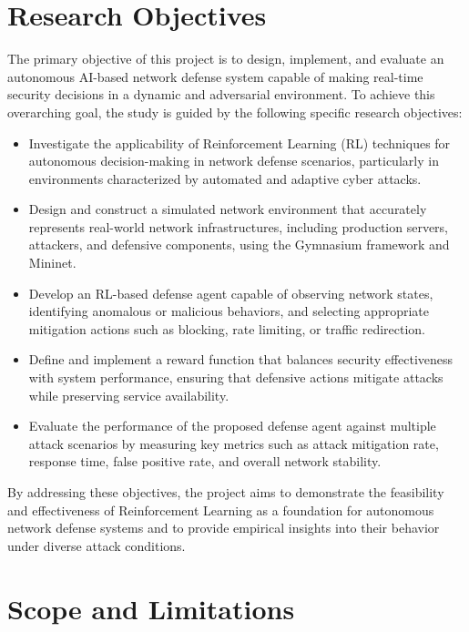 \documentclass[12pt,a4paper]{report}
\begin{document}
\section{Research Objectives}

The primary objective of this project is to design, implement, and evaluate an autonomous AI-based network defense system capable of making real-time security decisions in a dynamic and adversarial environment.
To achieve this overarching goal, the study is guided by the following specific research objectives:

\begin{itemize}
    \item Investigate the applicability of Reinforcement Learning (RL) techniques for autonomous decision-making in network defense scenarios, particularly in environments characterized by automated and adaptive cyber attacks.
    
    \item Design and construct a simulated network environment that accurately represents real-world network infrastructures, including production servers, attackers, and defensive components, using the Gymnasium framework and Mininet.
    
    \item Develop an RL-based defense agent capable of observing network states, identifying anomalous or malicious behaviors, and selecting appropriate mitigation actions such as blocking, rate limiting, or traffic redirection.
    
    \item Define and implement a reward function that balances security effectiveness with system performance, ensuring that defensive actions mitigate attacks while preserving service availability.
    
    \item Evaluate the performance of the proposed defense agent against multiple attack scenarios by measuring key metrics such as attack mitigation rate, response time, false positive rate, and overall network stability.
\end{itemize}

By addressing these objectives, the project aims to demonstrate the feasibility and effectiveness of Reinforcement Learning as a foundation for autonomous network defense systems and to provide empirical insights into their behavior under diverse attack conditions.

\section{Scope and Limitations}
\end{document}
